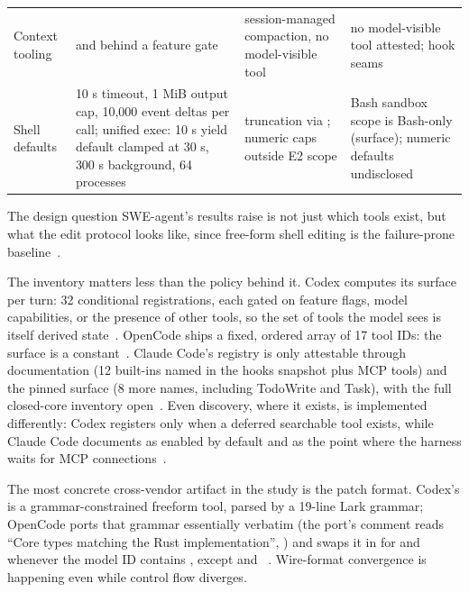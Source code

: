 \documentclass{article}
\newcommand{\codex}[0]{Codex}
\newcommand{\occ}[0]{OpenCode}
\newcommand{\ccc}[0]{Claude Code}
\begin{document}
\begin{table}[t]
\begin{tabular}{@{}L{1.7cm}L{3.75cm}L{3.75cm}L{3.75cm}@{}}
Context tooling &  and  behind a feature gate & session-managed compaction, no model-visible tool & no model-visible tool attested;  hook seams\\
Shell defaults & 10 s timeout, 1 MiB output cap, 10{,}000 event deltas per call; unified exec: 10 s yield default clamped at 30 s, 300 s background, 64 processes & truncation via ; numeric caps outside E2 scope & Bash sandbox scope is Bash-only (surface); numeric defaults undisclosed\\
\bottomrule
\end{tabular}
\end{table}

The design question SWE-agent's results raise is not just which tools
exist, but what the edit protocol looks like, since free-form shell
editing is the failure-prone baseline~\citep{yang2024sweagent}.

The inventory matters less than the policy behind it. \codex{} computes
its surface per turn: 32 conditional registrations, each gated on feature
flags, model capabilities, or the presence of other tools, so the set of
tools the model sees is itself derived
state~\citep{codexRepo}. \occ{} ships a fixed, ordered array of 17 tool
IDs: the surface is a constant~\citep{opencodeRepo}. \ccc{}'s registry is
only attestable through documentation (12 built-ins named in the hooks
snapshot plus MCP tools) and the pinned surface (8 more names, including
TodoWrite and Task), with the full closed-core inventory
open~\citep{claudeCodeHooksDocs,claudeCodeSurface}. Even discovery, where
it exists, is implemented differently: \codex{} registers
 only when a deferred searchable tool exists, while
\ccc{} documents  as enabled by default and as the point
where the harness waits for MCP
connections~\citep{codexRepo,claudeCodeMcpDocs}.

The most concrete cross-vendor artifact in the study is the patch format.
\codex{}'s  is a grammar-constrained freeform tool,
parsed by a 19-line Lark grammar; \occ{} ports that grammar essentially
verbatim (the port's comment reads ``Core types matching the Rust
implementation'', ) and swaps it in for
 and  whenever the model ID contains
, except  and
~\citep{codexRepo,opencodeRepo}. Wire-format convergence is
happening even while control flow diverges.
\end{document}
